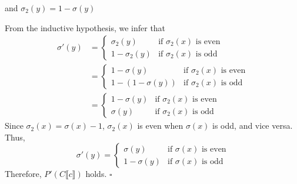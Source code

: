 \documentclass{article}
\begin{document}
\begin{enumerate}
\begin{enumerate}
\begin{itemize}
            and \(\sigma_2(y) = 1 - \sigma(y)\)
        \end{itemize}
        From the inductive hypothesis, we infer that
        \begin{equation}
            \begin{aligned}
                \sigma'(y) & =
                \begin{cases}
                    \sigma_2(y) & \text{if } \sigma_2(x) \text{ is even} \\
                    1 - \sigma_2(y) & \text{if } \sigma_2(x) \text{ is odd}
                \end{cases} \\
                & =
                \begin{cases}
                    1 - \sigma(y) & \text{if } \sigma_2(x) \text{ is even} \\
                    1 - (1 - \sigma(y)) & \text{if } \sigma_2(x) \text{ is odd}
                \end{cases} \\
                & =
                \begin{cases}
                    1 - \sigma(y) & \text{if } \sigma_2(x) \text{ is even} \\
                    \sigma(y) & \text{if } \sigma_2(x) \text{ is odd}
                \end{cases}
            \end{aligned}
        \end{equation}
        Since \(\sigma_2(x) = \sigma(x) - 1\), \(\sigma_2(x)\) is even when \(\sigma(x)\) is odd, and vice versa. Thus,
        \begin{equation}
            \sigma'(y) =
            \begin{cases}
                \sigma(y) & \text{if } \sigma(x) \text{ is even} \\
                1 - \sigma(y) & \text{if } \sigma(x) \text{ is odd}
            \end{cases}
        \end{equation}
        Therefore, \(P'(C \llbracket c \rrbracket)\) holds.
        \(\square\)
    \end{enumerate}
\end{enumerate}
\end{document}
